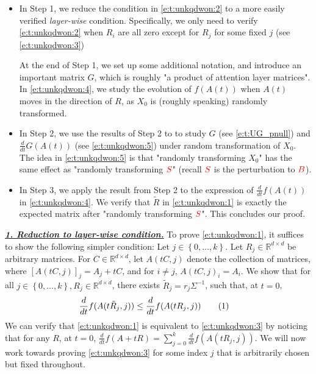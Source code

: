\documentclass{article}
\newcommand{\R}{\mathbb{R}}
\newcommand{\emphh}[1]{\textbf{\emph{#1}}}
\newcommand*\lrb[1]{\left[ #1 \right]}
\newcommand*\lrbb[1]{\left\{ #1 \right\}}
\newcommand\numberthis{\addtocounter{equation}{1}\tag{\theequation}}
\begin{document}
\begin{itemize}[leftmargin=*]
\item  In Step 1, we reduce the condition in \eqref{e:t:unkqdwon:2} to a more easily verified \emph{layer-wise} condition. Specifically, we only need to verify \eqref{e:t:unkqdwon:2} when $R_i$ are all zero except for $R_j$ for some fixed $j$ (see \eqref{e:t:unkqdwon:3})

At the end of Step 1, we set up some additional notation, and introduce an important matrix $G$, which is roughly "a product of attention layer matrices". In \eqref{e:t:unkqdwon:4}, we study the evolution of $f(A(t))$ when $A(t)$ moves in the direction of $R$, as $X_0$ is (roughly speaking) randomly transformed. 

\item In Step 2, we use the results of Step 2 to to study $G$ (see \eqref{e:t:UG_pnull}) and $\frac{d}{dt} G(A(t))$ (see \eqref{e:t:unkqdwon:5}) under random transformation of $X_0$. The idea in \eqref{e:t:unkqdwon:5} is that "randomly transforming $X_0$" has the same effect as "randomly transforming $\textcolor{red}{S}$" (recall $\textcolor{red}{S}$ is the perturbation to $\textcolor{red}{B}$). 

\item In Step 3, we apply the result from Step 2 to the expression of $\frac{d}{dt} f(A(t))$ in \eqref{e:t:unkqdwon:4}. We verify that $\tilde{R}$ in \eqref{e:t:unkqdwon:1} is exactly the expected matrix after "randomly transforming $\textcolor{red}{S}$". This concludes our proof.
\end{itemize}

\underline{\emphh{1. Reduction to layer-wise condition.}}
To prove \eqref{e:t:unkqdwon:1}, it suffices to show the following simpler condition: Let $j\in \lrbb{0,\dots,k}$. Let $R_j\in \R^{d\times d}$ be arbitrary matrices. For $C\in \R^{d\times d}$, let $A(t C, j)$ denote the collection of matrices, where $\lrb{A(t C, j)}_j = A_j + t C$, and for $i\neq j$, $A(t C, j)_i = A_i$. We show that for all $j\in \lrbb{0,\dots,k},R_j\in \R^{d\times d}$, there exists $\tilde{R}_j = r_j \Sigma^{-1}$, such that, at $t=0$,
\begin{align*}
& \frac{d}{dt} f(A(t\tilde{R}_j, j)) \leq \frac{d}{dt} f(A(tR_j,j))
\numberthis \label{e:t:unkqdwon:3}
\end{align*}
We can verify that \eqref{e:t:unkqdwon:1} is equivalent to \eqref{e:t:unkqdwon:3} by noticing that for any $R$, at $t=0$, $\frac{d}{dt} f(A + tR) = \sum_{j=0}^k \frac{d}{dt} f(A(tR_j,j))$. We will now work towards proving \eqref{e:t:unkqdwon:3} for some index $j$ that is arbitrarily chosen but fixed throughout.
\end{document}
